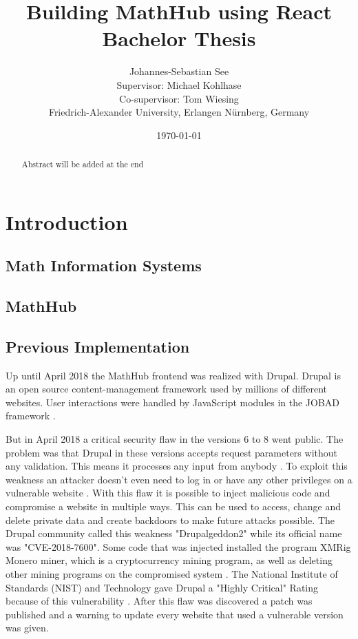 \documentclass[11pt,a4paper]{article}
\title{Building MathHub using React\\ \vspace{2 mm} Bachelor Thesis}
\author{Johannes-Sebastian See\\Supervisor: Michael Kohlhase\\Co-supervisor: Tom Wiesing\\Friedrich-Alexander University, Erlangen Nürnberg, Germany}
\date{\today}
\begin{document}
\begin{titlepage}
\maketitle
\begin{abstract}
Abstract will be added at the end
\end{abstract}

\end{titlepage}

\tableofcontents
\section{Introduction}
\subsection{Math Information Systems}
\subsection{MathHub}
\subsection{Previous Implementation}
Up until April 2018 the MathHub frontend was realized with Drupal.
Drupal is an open source content-management framework used by millions of different websites.
User interactions were handled by JavaScript modules in the JOBAD framework \cite{comp}.
	
But in April 2018 a critical security flaw in the versions 6 to 8 went public.
The problem was that Drupal in these versions accepts request parameters without any validation.
This means it processes any input from anybody \cite{zdnet}.
To exploit this weakness an attacker doesn't even need to log in or have any other privileges on a vulnerable website \cite{register}.
With this flaw it is possible to inject malicious code and compromise a website in multiple ways.
This can be used to access, change and delete private data and create backdoors to make future attacks possible.
The Drupal community called this weakness "Drupalgeddon2" while its official name was "CVE-2018-7600".
Some code that was injected installed the program XMRig Monero miner, which is a cryptocurrency mining program, as well as deleting other mining programs on the compromised system \cite{hacker}.
The National Institute of Standards (NIST) and Technology gave Drupal a "Highly Critical" Rating because of this vulnerability \cite{nist}.
 After this flaw was discovered a patch was published and a warning to update every website that used a vulnerable version was given.
	
\end{document}
